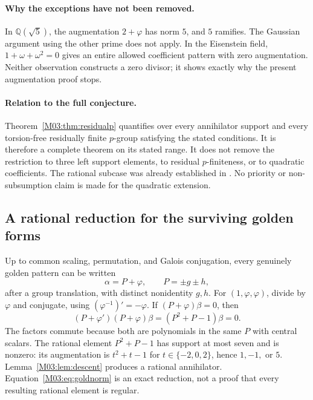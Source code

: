 \documentclass[11pt,a4paper,oneside]{report}
\theoremstyle{definition}
\theoremstyle{remark}
\newcommand{\Q}{\mathbb Q}
\newcommand{\ph}{\varphi}
\begin{document}
\paragraph{Why the exceptions have not been removed.}
In \(\Q(\sqrt5)\), the augmentation \(2+\ph\) has norm \(5\), and \(5\) ramifies. The Gaussian argument using the other prime does not apply. In the Eisenstein field, \(1+\omega+\omega^2=0\) gives an entire allowed coefficient pattern with zero augmentation. Neither observation constructs a zero divisor; it shows exactly why the present augmentation proof stops.

\paragraph{Relation to the full conjecture.}
Theorem~\ref{M03:thm:residualp} quantifies over every annihilator support and every torsion-free residually finite \(p\)-group satisfying the stated conditions. It is therefore a complete theorem on its stated range. It does not remove the restriction to three left support elements, to residual \(p\)-finiteness, or to quadratic coefficients. The rational subcase was already established in \cite{B:ATrational}. No priority or non-subsumption claim is made for the quadratic extension.

\subsection{A rational reduction for the surviving golden forms}
Up to common scaling, permutation, and Galois conjugation, every genuinely golden pattern can be written
\[
\alpha=P+\ph,\qquad P=\pm g\pm h,
\]
after a group translation, with distinct nonidentity \(g,h\). For \((1,\ph,\ph)\), divide by \(\ph\) and conjugate, using \((\ph^{-1})'=-\ph\). If \((P+\ph)\beta=0\), then
\begin{equation}\label{M03:eq:goldnorm}
(P+\ph')(P+\ph)\beta=(P^2+P-1)\beta=0.
\end{equation}
The factors commute because both are polynomials in the same \(P\) with central scalars. The rational element \(P^2+P-1\) has support at most seven and is nonzero: its augmentation is \(t^2+t-1\) for \(t\in\{-2,0,2\}\), hence \(1,-1,\) or \(5\). Lemma~\ref{M03:lem:descent} produces a rational annihilator. Equation~\eqref{M03:eq:goldnorm} is an exact reduction, not a proof that every resulting rational element is regular.
\end{document}
